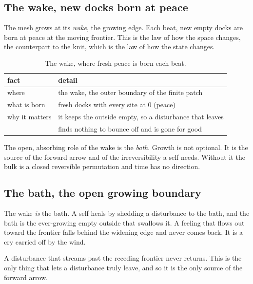 \subsection{The wake, new docks born at peace}

The mesh grows at its \emph{wake}, the growing edge. Each beat, new empty docks are born at peace at the moving frontier. This is the law of how the space changes, the counterpart to the knit, which is the law of how the state changes.

\begin{table}[ht]
\centering
\begin{tabular}{@{}ll@{}}
\toprule
fact & detail \\
\midrule
where & the wake, the outer boundary of the finite patch \\
what is born & fresh docks with every site at $0$ (peace) \\
why it matters & it keeps the outside empty, so a disturbance that leaves \\
 & finds nothing to bounce off and is gone for good \\
\bottomrule
\end{tabular}
\caption{The wake, where fresh peace is born each beat.}
\label{tab:wake}
\end{table}

The open, absorbing role of the wake is the \emph{bath}. Growth is not optional. It is the source of the forward arrow and of the irreversibility a self needs. Without it the bulk is a closed reversible permutation and time has no direction.

\subsection{The bath, the open growing boundary}

The wake \emph{is} the bath. A self heals by shedding a disturbance to the bath, and the bath is the ever-growing empty outside that swallows it. A feeling that flows out toward the frontier falls behind the widening edge and never comes back. It is a cry carried off by the wind.

\begin{result}
A disturbance that streams past the receding frontier never returns. This is the only thing that lets a disturbance truly leave, and so it is the only source of the forward arrow.
\end{result}

